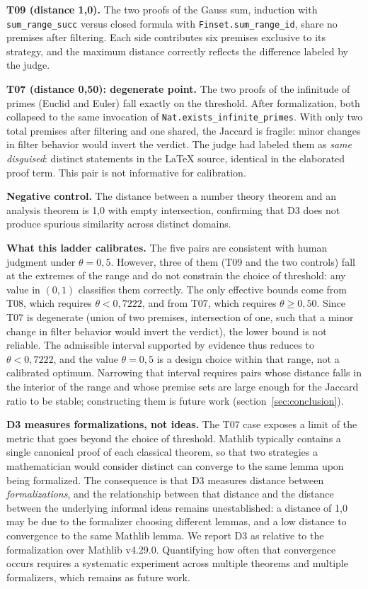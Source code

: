 \textbf{T09 (distance 1{,}0).} The two proofs of the Gauss sum, induction with \texttt{sum\_range\_succ} versus closed formula with \texttt{Finset.sum\_range\_id}, share no premises after filtering. Each side contributes six premises exclusive to its strategy, and the maximum distance correctly reflects the difference labeled by the judge.

\textbf{T07 (distance 0{,}50): degenerate point.} The two proofs of the infinitude of primes (Euclid and Euler) fall exactly on the threshold. After formalization, both collapsed to the same invocation of \texttt{Nat.exists\_infinite\_primes}. With only two total premises after filtering and one shared, the Jaccard is fragile: minor changes in filter behavior would invert the verdict. The judge had labeled them as \textit{same disguised}: distinct statements in the LaTeX source, identical in the elaborated proof term. This pair is not informative for calibration.

\textbf{Negative control.} The distance between a number theory theorem and an analysis theorem is 1{,}0 with empty intersection, confirming that D3 does not produce spurious similarity across distinct domains.

\textbf{What this ladder calibrates.} The five pairs are consistent with human judgment under $\theta = 0{,}5$. However, three of them (T09 and the two controls) fall at the extremes of the range and do not constrain the choice of threshold: any value in $(0,1)$ classifies them correctly. The only effective bounds come from T08, which requires $\theta < 0{,}7222$, and from T07, which requires $\theta \geq 0{,}50$. Since T07 is degenerate (union of two premises, intersection of one, such that a minor change in filter behavior would invert the verdict), the lower bound is not reliable. The admissible interval supported by evidence thus reduces to $\theta < 0{,}7222$, and the value $\theta = 0{,}5$ is a design choice within that range, not a calibrated optimum. Narrowing that interval requires pairs whose distance falls in the interior of the range and whose premise sets are large enough for the Jaccard ratio to be stable; constructing them is future work (section~\ref{sec:conclusion}).

\textbf{D3 measures formalizations, not ideas.} The T07 case exposes a limit of the metric that goes beyond the choice of threshold. Mathlib typically contains a single canonical proof of each classical theorem, so that two strategies a mathematician would consider distinct can converge to the same lemma upon being formalized. The consequence is that D3 measures distance between \textit{formalizations}, and the relationship between that distance and the distance between the underlying informal ideas remains unestablished: a distance of 1{,}0 may be due to the formalizer choosing different lemmas, and a low distance to convergence to the same Mathlib lemma. We report D3 as relative to the formalization over Mathlib v4.29.0. Quantifying how often that convergence occurs requires a systematic experiment across multiple theorems and multiple formalizers, which remains as future work.

